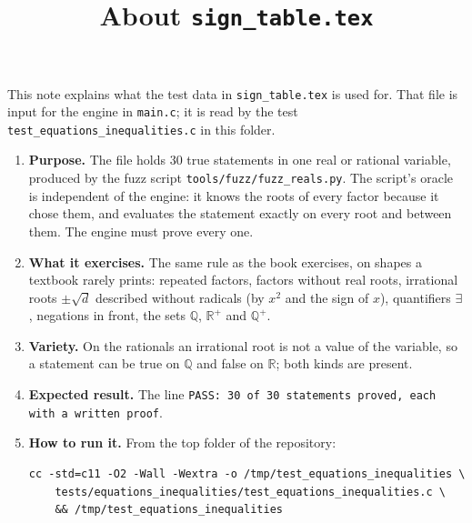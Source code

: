 \documentclass[11pt,a4paper]{article}
\title{About \texttt{sign\_table.tex}}
\author{}
\date{}
\begin{document}
\maketitle
This note explains what the test data in \texttt{sign\_table.tex} is used for. That file is input for the engine in \texttt{main.c}; it is read by the test \texttt{test\_equations\_inequalities.c} in this folder.

\begin{enumerate}
\item \textbf{Purpose.} The file holds 30 true statements in one real or rational variable, produced by the fuzz script \texttt{tools/fuzz/fuzz\_reals.py}. The script's oracle is independent of the engine: it knows the roots of every factor because it chose them, and evaluates the statement exactly on every root and between them. The engine must prove every one.

\item \textbf{What it exercises.} The same rule as the book exercises, on shapes a textbook rarely prints: repeated factors, factors without real roots, irrational roots $\pm\sqrt{d}$ described without radicals (by $x^{2}$ and the sign of $x$), quantifiers $\exists$, negations in front, the sets $\mathbb{Q}$, $\mathbb{R}^{+}$ and $\mathbb{Q}^{+}$.

\item \textbf{Variety.} On the rationals an irrational root is not a value of the variable, so a statement can be true on $\mathbb{Q}$ and false on $\mathbb{R}$; both kinds are present.

\item \textbf{Expected result.} The line \texttt{PASS: 30 of 30 statements proved, each with a written proof}.

\item \textbf{How to run it.} From the top folder of the repository:
\begin{verbatim}
cc -std=c11 -O2 -Wall -Wextra -o /tmp/test_equations_inequalities \
    tests/equations_inequalities/test_equations_inequalities.c \
    && /tmp/test_equations_inequalities
\end{verbatim}
\end{enumerate}
\end{document}
